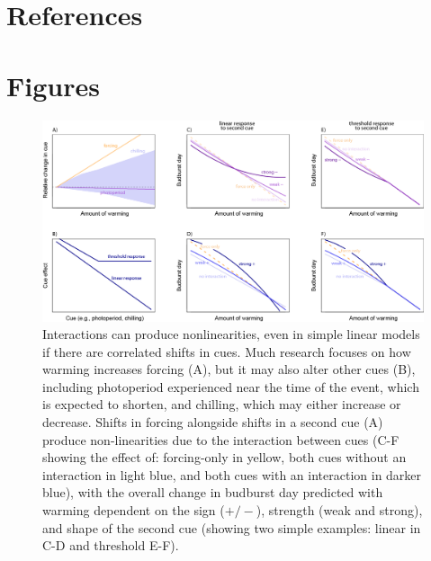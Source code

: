 \documentclass[11pt,letter]{article}
\begin{document}
\clearpage

\section{References}


\clearpage

\section{Figures}

\clearpage
\begin{figure}
\centering
\includegraphics[width=1\textwidth]{..//..//analyses/limitingcues/figures/intxnsims2021photoaltwithchill_6panels_polyg_imc.png}
\caption{Interactions can produce nonlinearities, even in simple linear models if there are correlated shifts in cues. Much research focuses on how warming increases forcing (A), but it may also alter other cues (B), including photoperiod experienced near the time of the event, which is expected to shorten, and chilling, which may either increase or decrease. Shifts in forcing alongside shifts in a second cue (A) produce non-linearities due to the interaction between cues (C-F showing the effect of: forcing-only in yellow, both cues without an interaction in light blue, and both cues with an interaction in darker blue), with the overall change in budburst day predicted with warming dependent on the sign ($+/-$), strength (weak and strong), and shape of the second cue (showing two simple examples: linear in C-D and threshold E-F).}
  \label{fig:intxncues}
\end{figure}
\end{document}
